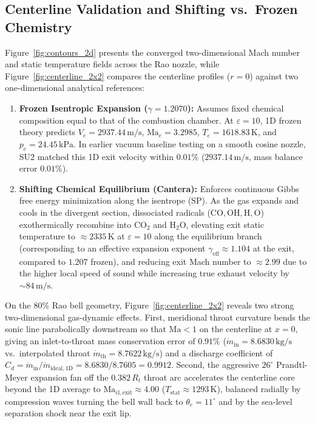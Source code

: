 \documentclass[11pt,a4paper]{article}
\begin{document}
\subsection{Centerline Validation and Shifting vs.\ Frozen Chemistry}
Figure~\ref{fig:contours_2d} presents the converged two-dimensional Mach number and static temperature fields across the Rao nozzle, while Figure~\ref{fig:centerline_2x2} compares the centerline profiles ($r = 0$) against two one-dimensional analytical references:
\begin{enumerate}
    \item \textbf{Frozen Isentropic Expansion ($\gamma = 1.2070$):} Assumes fixed chemical composition equal to that of the combustion chamber. At $\varepsilon = 10$, 1D frozen theory predicts $V_e = 2937.44\,\mathrm{m/s}$, $\mathrm{Ma}_e = 3.2985$, $T_e = 1618.83\,\mathrm{K}$, and $p_e = 24.45\,\mathrm{kPa}$. In earlier vacuum baseline testing on a smooth cosine nozzle, SU2 matched this 1D exit velocity within $0.01\%$ ($2937.14\,\mathrm{m/s}$, mass balance error $0.01\%$).
    \item \textbf{Shifting Chemical Equilibrium (Cantera):} Enforces continuous Gibbs free energy minimization along the isentrope ($\mathrm{SP}$). As the gas expands and cools in the divergent section, dissociated radicals ($\mathrm{CO}, \mathrm{OH}, \mathrm{H}, \mathrm{O}$) exothermically recombine into $\mathrm{CO_2}$ and $\mathrm{H_2O}$, elevating exit static temperature to $\approx 2335\,\mathrm{K}$ at $\varepsilon = 10$ along the equilibrium branch (corresponding to an effective expansion exponent $\gamma_{\mathrm{eff}} \approx 1.104$ at the exit, compared to $1.207$ frozen), and reducing exit Mach number to $\approx 2.99$ due to the higher local speed of sound while increasing true exhaust velocity by $\sim 84\,\mathrm{m/s}$.
\end{enumerate}

On the 80\% Rao bell geometry, Figure~\ref{fig:centerline_2x2} reveals two strong two-dimensional gas-dynamic effects. First, meridional throat curvature bends the sonic line parabolically downstream so that $\mathrm{Ma} < 1$ on the centerline at $x = 0$, giving an inlet-to-throat mass conservation error of $0.91\%$ ($\dot{m}_{\mathrm{in}} = 8.6830\,\mathrm{kg/s}$ vs.\ interpolated throat $\dot{m}_{\mathrm{th}} = 8.7622\,\mathrm{kg/s}$) and a discharge coefficient of $C_d = \dot{m}_{\mathrm{in}}/\dot{m}_{\mathrm{ideal,1D}} = 8.6830 / 8.7605 = 0.9912$. Second, the aggressive $26^\circ$ Prandtl-Meyer expansion fan off the $0.382\,R_t$ throat arc accelerates the centerline core beyond the 1D average to $\mathrm{Ma}_{\mathrm{cl,exit}} \approx 4.00$ ($T_{\mathrm{stat}} \approx 1293\,\mathrm{K}$), balanced radially by compression waves turning the bell wall back to $\theta_e = 11^\circ$ and by the sea-level separation shock near the exit lip.
\end{document}
